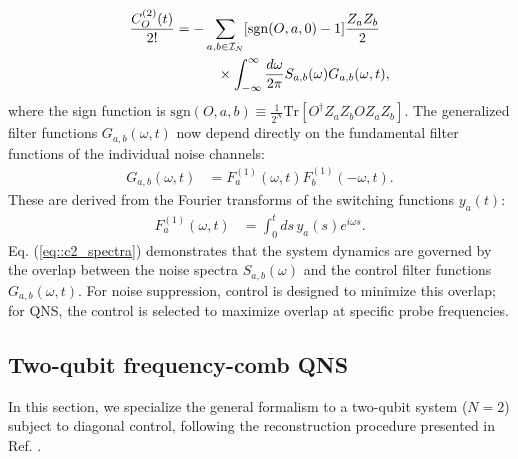 \documentclass[%
 reprint,
superscriptaddress,
 amsmath,amssymb,
 aps,
pra,
floatfix,
]{revtex4-2}
\begin{document}
\begin{align}
    \frac{C_{O}^{(2)}(t)}{2!}&=-\sum_{a,b\in\mathcal{I}_N}[\text{sgn}(O,a,0)-1]\frac{Z_aZ_b}{2}\notag\\
    &\qquad\quad\times\int_{-\infty}^{\infty}\frac{d\omega}{2\pi}S_{a,b}(\omega)G_{a,b}(\omega,t),
    \label{eq::c2_spectra}
\end{align}
where the sign function is $\text{sgn}(O,a,b)\equiv\frac{1}{2^N}\text{Tr}\left[O^{\dagger}Z_aZ_bOZ_aZ_b\right]$.
The generalized filter functions $G_{a,b}(\omega,t)$ now depend directly on the fundamental filter functions of the individual noise channels:
\begin{align}
    G_{a,b}(\omega,t)&=F^{(1)}_{a}(\omega,t)F^{(1)}_{b}(-\omega,t).
\end{align}
These are derived from the Fourier transforms of the switching functions $y_a(t)$:
\begin{align}
    F_{a}^{(1)}(\omega, t)&=\int_0^t ds\,y_{a}(s)e^{i\omega s}.
\end{align}
Eq. (\ref{eq::c2_spectra}) demonstrates that the system dynamics are governed by the overlap between the noise spectra $S_{a,b}(\omega)$ and the control filter functions $G_{a,b}(\omega,t)$. For noise suppression, control is designed to minimize this overlap; for QNS, the control is selected to maximize overlap at specific probe frequencies.

\subsection{Two-qubit frequency-comb QNS}
\label{sec::FCQNS}
In this section, we specialize the general formalism to a two-qubit system ($N=2$) subject to diagonal control, following the reconstruction procedure presented in Ref. \cite{PhysRevA.95.022121}.
\end{document}
